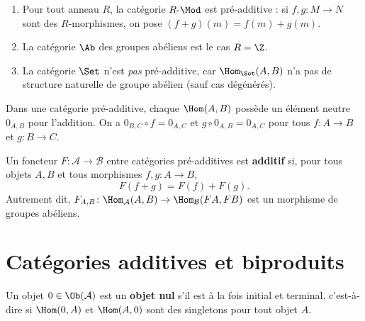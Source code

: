 \begin{exemple}\label{ex:preadditive}
\begin{enumerate}[label=(\roman*)]
\item Pour tout anneau $R$, la catégorie $R\text{-}\Mod$
  est pré-additive : si $f, g \colon M \to N$ sont des $R$-morphismes,
  on pose $(f + g)(m) = f(m) + g(m)$.

\item La catégorie $\Ab$ des groupes abéliens
  est le cas $R = \Z$.

\item La catégorie $\Set$ n'est \emph{pas}
  pré-additive, car $\Hom_{\Set}(A, B)$ n'a pas de structure naturelle
  de groupe abélien (sauf cas dégénérés).
\end{enumerate}
\end{exemple}

\begin{remarque}\label{rem:zero-morphism}
Dans une catégorie pré-additive, chaque $\Hom(A, B)$ possède un
élément neutre $0_{A,B}$ pour l'addition. On a
$0_{B,C} \circ f = 0_{A,C}$ et $g \circ 0_{A,B} = 0_{A,C}$
pour tous $f \colon A \to B$ et $g \colon B \to C$.
\end{remarque}

\begin{definition}\label{def:additive-functor}
Un foncteur $F \colon \mathcal{A} \to \mathcal{B}$ entre catégories
pré-additives est \textbf{additif} si, pour tous objets $A, B$ et tous
morphismes $f, g \colon A \to B$,
\[
  F(f + g) = F(f) + F(g).
\]
Autrement dit, $F_{A,B} \colon \Hom_{\mathcal{A}}(A, B) \to
\Hom_{\mathcal{B}}(FA, FB)$ est un morphisme de groupes abéliens.
\end{definition}


\section{Catégories additives et biproduits}\label{sec:additive}

\begin{definition}\label{def:zero-object}
Un objet $0 \in \Ob(\mathcal{A})$ est un \textbf{objet nul}
s'il est à la fois initial et terminal, c'est-à-dire si
$\Hom(0, A)$ et $\Hom(A, 0)$ sont des singletons pour tout objet $A$.
\end{definition}

